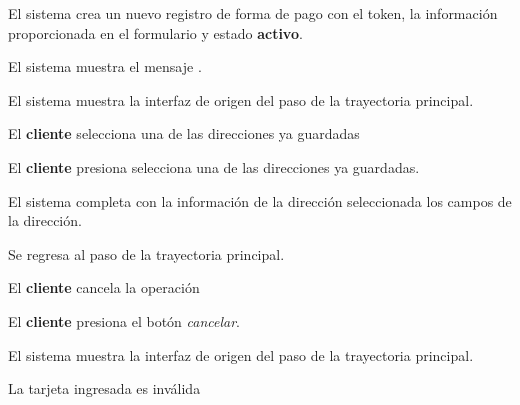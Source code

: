 {\begin{trayectoriaPrincipal}
    \item El sistema crea un nuevo registro de forma de pago con el token, la
      información proporcionada en el formulario y estado \textbf{activo}.

    \item El sistema muestra el mensaje
      .

    \item El sistema muestra la interfaz de origen del paso
       de la trayectoria principal.

  \end{trayectoriaPrincipal}


  \begin{trayectoriaAlternativa}
    {El \textbf{cliente} selecciona una de las direcciones ya guardadas}

    \item El \textbf{cliente} presiona selecciona una de las direcciones ya
      guardadas.

    \item El sistema completa con la información de la dirección seleccionada
      los campos de la dirección.

    \item Se regresa al paso  de la trayectoria
      principal.

  \end{trayectoriaAlternativa}


  \begin{trayectoriaAlternativa}
    {El \textbf{cliente} cancela la operación}

    \item El \textbf{cliente} presiona el botón \textit{cancelar}.

    \item El sistema muestra la interfaz de origen del paso
       de la trayectoria principal.

  \end{trayectoriaAlternativa}


  \begin{trayectoriaAlternativa}
    {La tarjeta ingresada es inválida}


\end{trayectoriaAlternativa}}
